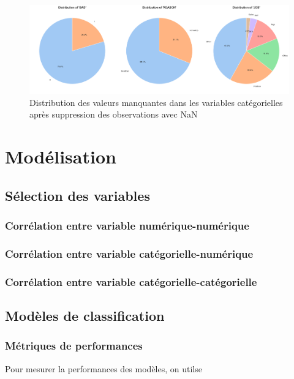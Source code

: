 \documentclass[a4paper,12pt]{report}
\begin{document}
\begin{figure}[h!]
  \includegraphics[width=\textwidth]{piechart_valeurs_manquantes_var_categorial_dropna.png}
  \caption{Distribution des valeurs manquantes dans les variables catégorielles après suppression des observations avec NaN}
  \label{fig:dist_missing_values_cat_dropna}
\end{figure}


\chapter{Modélisation}

\section{Sélection des variables}

\subsection{Corrélation entre variable numérique-numérique}
\subsection{Corrélation entre variable catégorielle-numérique}
\subsection{Corrélation entre variable catégorielle-catégorielle}


\section{Modèles de classification}

\subsection{Métriques de performances}

Pour mesurer la performances des modèles, on utilse
\end{document}
